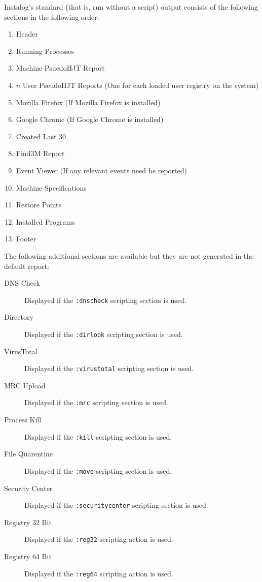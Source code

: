 \documentclass[letterpaper,12pt]{article}
\begin{document}
Instalog's standard (that is, run without a script) output consists of the
following sections in the following order:
\begin{enumerate}
    \item Header
    \item Running Processes
    \item Machine PsuedoHJT Report
    \item $n$ User PseudoHJT Reports (One for each loaded user registry on the
    system)
    \item Mozilla Firefox (If Mozilla Firefox is installed)
    \item Google Chrome (If Google Chrome is installed)
    \item Created Last 30
    \item Find3M Report
    \item Event Viewer (If any relevant events need be reported)
    \item Machine Specifications
    \item Restore Points
    \item Installed Programs
    \item Footer
\end{enumerate}

\noindent{}The following additional sections are available but they are not
generated in the default report:
\begin{description}
\item[DNS Check] Displayed if the \verb|:dnscheck| scripting section is used.
\item[Directory] Displayed if the \verb|:dirlook| scripting section is used.
\item[VirusTotal] Displayed if the \verb|:virustotal| scripting section is used.
\item[MRC Upload] Displayed if the \verb|:mrc| scripting section is used.
\item[Process Kill] Displayed if the \verb|:kill| scripting section is used.
\item[File Quarentine] Displayed if the \verb|:move| scripting section is used.
\item[Security Center] Displayed if the \verb|:securitycenter| scripting section
is used.
\item[Registry 32 Bit] Displayed if the \verb|:reg32| scripting action is used.
\item[Registry 64 Bit] Displayed if the \verb|:reg64| scripting action is used.
\end{description}
\end{document}
